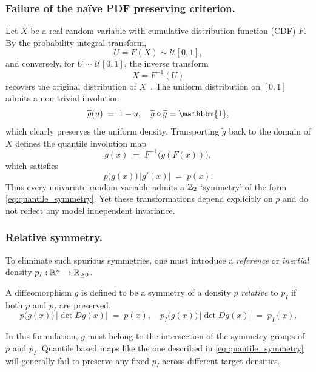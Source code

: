 \subsubsection{Failure of the na\"ive PDF preserving criterion.}
    Let $X$ be a real random variable with cumulative distribution function (CDF) $F$.  By the probability integral transform,
    \begin{equation}
        U = F(X) \sim \mathcal{U}[0,1],
    \end{equation}
    and conversely, for $U\sim \mathcal{U}[0,1]$, the inverse transform
    \begin{equation}
        X = F^{-1}(U)
    \end{equation}
recovers the original distribution of $X$~\cite{Casella2024StatisticalEdition}. 
%
The uniform distribution on $[0,1]$ admits a non-trivial involution
\begin{equation}
    \widetilde{g}(u) \;=\; 1 - u,
    \quad
    \widetilde{g}\circ \widetilde{g} = \mathbbm{1},
\end{equation}
which clearly preserves the uniform density.
%
Transporting $\widetilde{g}$ back to the domain of $X$ defines the quantile involution map
\begin{equation}
    \label{eq:quantile_symmetry}
    g(x) \;=\; F^{-1}\bigl(\widetilde{g}(F(x))\bigr),
\end{equation}
which satisfies
\[
    p\bigl(g(x)\bigr)\,\bigl|g'(x)\bigr|
    \;=\; p(x).
\]
Thus every univariate random variable admits a $\mathbb{Z}_2$ `symmetry' of the form \cref{eq:quantile_symmetry}.
%
Yet these transformations depend explicitly on $p$ and do not reflect any model independent invariance.

\subsubsection{Relative symmetry.}
    To eliminate such spurious symmetries, one must introduce a \emph{reference} or \emph{inertial} density $p_I : \mathbb{R}^n \to \mathbb{R}_{\ge0}$. 
    \begin{definition}
        A diffeomorphism $g$ is defined to be a symmetry of a density $p$ \emph{relative} to $p_I$ if both $p$ and $p_I$ are preserved.
    \begin{equation}\label{eq:relative_symmetry}
        p\bigl(g(x)\bigr)\,\bigl|\det Dg(x)\bigr|
        \;=\; p(x),
        \quad
        p_I\bigl(g(x)\bigr)\,\bigl|\det Dg(x)\bigr|
        \;=\; p_I(x).
    \end{equation}
    \end{definition}
In this formulation, $g$ must belong to the intersection of the symmetry groups of $p$ and $p_I$.
%
Quantile based maps like the one described in \cref{eq:quantile_symmetry} will generally fail to preserve any fixed $p_I$ across different target densities.

